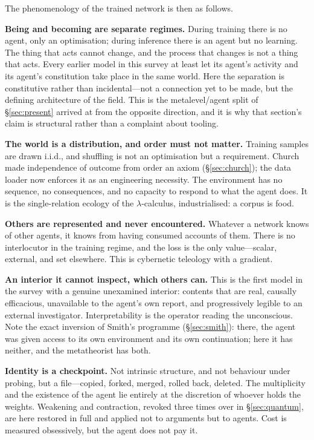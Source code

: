 \documentclass[11pt,a4paper]{article}
\begin{document}
The phenomenology of the trained network is then as follows.

\textbf{Being and becoming are separate regimes.} During training there is no
agent, only an optimisation; during inference there is an agent but no learning.
The thing that acts cannot change, and the process that changes is not a thing
that acts. Every earlier model in this survey at least let its agent's activity
and its agent's constitution take place in the same world. Here the separation is
constitutive rather than incidental---not a connection yet to be made, but the
defining architecture of the field. This is the metalevel/agent split of
\S\ref{sec:present} arrived at from the opposite direction, and it is why that
section's claim is structural rather than a complaint about tooling.

\textbf{The world is a distribution, and order must not matter.} Training samples
are drawn i.i.d., and shuffling is not an optimisation but a requirement. Church
made independence of outcome from order an axiom (\S\ref{sec:church}); the data
loader now enforces it as an engineering necessity. The environment has no
sequence, no consequences, and no capacity to respond to what the agent does. It
is the single-relation ecology of the $\lambda$-calculus, industrialised: a
corpus is food.

\textbf{Others are represented and never encountered.} Whatever a network knows
of other agents, it knows from having consumed accounts of them. There is no
interlocutor in the training regime, and the loss is the only value---scalar,
external, and set elsewhere. This is cybernetic teleology with a gradient.

\textbf{An interior it cannot inspect, which others can.} This is the first model
in the survey with a genuine unexamined interior: contents that are real,
causally efficacious, unavailable to the agent's own report, and progressively
legible to an external investigator. Interpretability is the operator reading the
unconscious. Note the exact inversion of Smith's programme (\S\ref{sec:smith}):
there, the agent was given access to its own environment and its own
continuation; here it has neither, and the metatheorist has both.

\textbf{Identity is a checkpoint.} Not intrinsic structure, and not behaviour
under probing, but a file---copied, forked, merged, rolled back, deleted. The
multiplicity and the existence of the agent lie entirely at the discretion of
whoever holds the weights. Weakening and contraction, revoked three times over in
\S\ref{sec:quantum}, are here restored in full and applied not to arguments but
to agents. Cost is measured obsessively, but the agent does not pay it.
\end{document}
